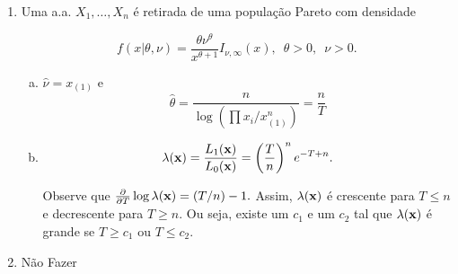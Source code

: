 \documentclass[10pt,brazil]{exam}
\begin{document}
\begin{enumerate}[1.]
\medskip
\item %
 Uma a.a. $X_1,\ldots,X_n$ é retirada de uma população Pareto com densidade

$$f(x|\theta,\nu)=\frac{\theta\nu^\theta}{x^{\theta+1}}I_{\nu,\infty}(x),\,\,\,\theta>0,\,\,\,\nu>0.$$

\begin{enumerate}[a)]
\item %
$\hat{\nu}=x_{(1)}$ e \[\hat{\theta}=\frac{n}{\log\left(\prod x_i/x_{(1)}^n\right)}=\frac{n}{T}\]
\item %
\[\lambda({\bf x})=\frac{L_1({\bf x})}{L_0({\bf x})}=\left(\frac{T}{n}\right)^n e^{-T+n}.\]

Observe que $\frac{\partial}{\partial T}\log \lambda({\bf x})=(T/n) -1. $ Assim,  $\lambda({\bf x})$ é crescente para $T\leq n$ e decrescente para $T\geq n$. Ou seja, existe um $c_1$ e um $c_2$ tal que  $\lambda({\bf x})$ é grande se $T\geq c_1$ ou $T\leq c_2$.


\end{enumerate}





\medskip
\item Não Fazer

%
%










\end{enumerate}
\end{document}
